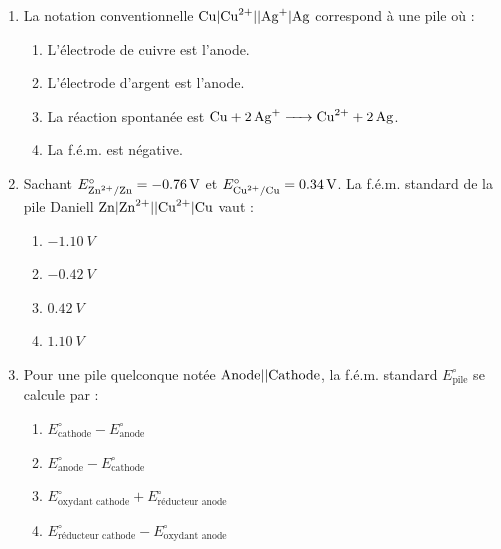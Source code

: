\documentclass[11pt]{article}
\begin{document}
\begin{exercice}
\begin{enumerate}
    \item La notation conventionnelle $\ce{Cu}|\ce{Cu^{2+}}||\ce{Ag+}|\ce{Ag}$ correspond à une pile où :
    \begin{enumerate}
        \item L'électrode de cuivre est l'anode.
        \item L'électrode d'argent est l'anode.
        \item La réaction spontanée est $\ce{Cu + 2Ag+ -> Cu^{2+} + 2Ag}$.
        \item La f.é.m. est négative.
    \end{enumerate}
    \item Sachant $E^\circ_{\ce{Zn^{2+}/Zn}} = \SI{-0,76}{V}$ et $E^\circ_{\ce{Cu^{2+}/Cu}} = \SI{+0,34}{V}$. La f.é.m. standard de la pile Daniell $\ce{Zn}|\ce{Zn^{2+}}||\ce{Cu^{2+}}|\ce{Cu}$ vaut :
    \begin{enumerate}
        \item $\SI{-1,10}{V}$
        \item $\SI{-0,42}{V}$
        \item $\SI{+0,42}{V}$
        \item $\SI{+1,10}{V}$
    \end{enumerate}
    \item Pour une pile quelconque notée $\ce{Anode}||\ce{Cathode}$, la f.é.m. standard $E^\circ_{\text{pile}}$ se calcule par :
    \begin{enumerate}
        \item $E^\circ_{\text{cathode}} - E^\circ_{\text{anode}}$
        \item $E^\circ_{\text{anode}} - E^\circ_{\text{cathode}}$
        \item $E^\circ_{\text{oxydant cathode}} + E^\circ_{\text{réducteur anode}}$
        \item $E^\circ_{\text{réducteur cathode}} - E^\circ_{\text{oxydant anode}}$
    \end{enumerate}
\end{enumerate}
\end{exercice}
\end{document}

